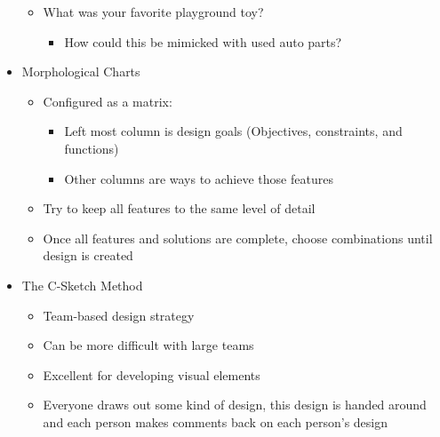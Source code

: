 \begin{itemize}
\begin{itemize}
      \item What was your favorite playground toy?

        \begin{itemize}

          \item How could this be mimicked with used auto parts?

        \end{itemize}

    \end{itemize}

  \item Morphological Charts

    \begin{itemize}

      \item Configured as a matrix:

        \begin{itemize}

          \item Left most column is design goals (Objectives, constraints, and functions)

          \item Other columns are ways to achieve those features

        \end{itemize}

      \item Try to keep all features to the same level of detail

      \item Once all features and solutions are complete, choose combinations until design is created

    \end{itemize}

  \item The C-Sketch Method

    \begin{itemize}

      \item Team-based design strategy

      \item Can be more difficult with large teams

      \item Excellent for developing visual elements

      \item Everyone draws out some kind of design, this design is handed around and each person makes comments back on each person's design


\end{itemize}
\end{itemize}
